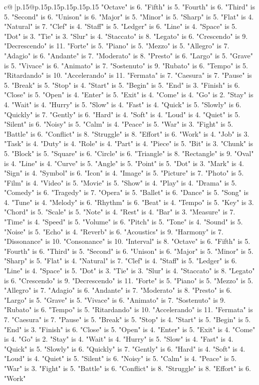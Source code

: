 \documentclass{article}
\begin{document}
{\begin{supertabular}{c@{$\;$}|p{.15\linewidth}@{}p{.15\linewidth}p{.15\linewidth}p{.15\linewidth}p{.15\linewidth}p{.15\linewidth}}
{{{"Octave" is 6. "Fifth" is 5. "Fourth" is 6. "Third" is 5. "Second" is 6. "Unison" is 6. "Major" is 5. "Minor" is 5. "Sharp" is 5. "Flat" is 4. "Natural" is 7. "Clef" is 4. "Staff" is 5. "Ledger" is 6. "Line" is 4. "Space" is 5. "Dot" is 3. "Tie" is 3. "Slur" is 4. "Staccato" is 8. "Legato" is 6. "Crescendo" is 9. "Decrescendo" is 11. "Forte" is 5. "Piano" is 5. "Mezzo" is 5. "Allegro" is 7. "Adagio" is 6. "Andante" is 7. "Moderato" is 8. "Presto" is 6. "Largo" is 5. "Grave" is 5. "Vivace" is 6. "Animato" is 7. "Sostenuto" is 9. "Rubato" is 6. "Tempo" is 5. "Ritardando" is 10. "Accelerando" is 11. "Fermata" is 7. "Caesura" is 7. "Pause" is 5. "Break" is 5. "Stop" is 4. "Start" is 5. "Begin" is 5. "End" is 3. "Finish" is 6. "Close" is 5. "Open" is 4. "Enter" is 5. "Exit" is 4. "Come" is 4. "Go" is 2. "Stay" is 4. "Wait" is 4. "Hurry" is 5. "Slow" is 4. "Fast" is 4. "Quick" is 5. "Slowly" is 6. "Quickly" is 7. "Gently" is 6. "Hard" is 4. "Soft" is 4. "Loud" is 4. "Quiet" is 5. "Silent" is 6. "Noisy" is 5. "Calm" is 4. "Peace" is 5. "War" is 3. "Fight" is 5. "Battle" is 6. "Conflict" is 8. "Struggle" is 8. "Effort" is 6. "Work" is 4. "Job" is 3. "Task" is 4. "Duty" is 4. "Role" is 4. "Part" is 4. "Piece" is 5. "Bit" is 3. "Chunk" is 5. "Block" is 5. "Square" is 6. "Circle" is 6. "Triangle" is 8. "Rectangle" is 9. "Oval" is 4. "Line" is 4. "Curve" is 5. "Angle" is 5. "Point" is 5. "Dot" is 3. "Mark" is 4. "Sign" is 4. "Symbol" is 6. "Icon" is 4. "Image" is 5. "Picture" is 7. "Photo" is 5. "Film" is 4. "Video" is 5. "Movie" is 5. "Show" is 4. "Play" is 4. "Drama" is 5. "Comedy" is 6. "Tragedy" is 7. "Opera" is 5. "Ballet" is 6. "Dance" is 5. "Song" is 4. "Tune" is 4. "Melody" is 6. "Rhythm" is 6. "Beat" is 4. "Tempo" is 5. "Key" is 3. "Chord" is 5. "Scale" is 5. "Note" is 4. "Rest" is 4. "Bar" is 3. "Measure" is 7. "Time" is 4. "Speed" is 5. "Volume" is 6. "Pitch" is 5. "Tone" is 4. "Sound" is 5. "Noise" is 5. "Echo" is 4. "Reverb" is 6. "Acoustics" is 9. "Harmony" is 7. "Dissonance" is 10. "Consonance" is 10. "Interval" is 8. "Octave" is 6. "Fifth" is 5. "Fourth" is 6. "Third" is 5. "Second" is 6. "Unison" is 6. "Major" is 5. "Minor" is 5. "Sharp" is 5. "Flat" is 4. "Natural" is 7. "Clef" is 4. "Staff" is 5. "Ledger" is 6. "Line" is 4. "Space" is 5. "Dot" is 3. "Tie" is 3. "Slur" is 4. "Staccato" is 8. "Legato" is 6. "Crescendo" is 9. "Decrescendo" is 11. "Forte" is 5. "Piano" is 5. "Mezzo" is 5. "Allegro" is 7. "Adagio" is 6. "Andante" is 7. "Moderato" is 8. "Presto" is 6. "Largo" is 5. "Grave" is 5. "Vivace" is 6. "Animato" is 7. "Sostenuto" is 9. "Rubato" is 6. "Tempo" is 5. "Ritardando" is 10. "Accelerando" is 11. "Fermata" is 7. "Caesura" is 7. "Pause" is 5. "Break" is 5. "Stop" is 4. "Start" is 5. "Begin" is 5. "End" is 3. "Finish" is 6. "Close" is 5. "Open" is 4. "Enter" is 5. "Exit" is 4. "Come" is 4. "Go" is 2. "Stay" is 4. "Wait" is 4. "Hurry" is 5. "Slow" is 4. "Fast" is 4. "Quick" is 5. "Slowly" is 6. "Quickly" is 7. "Gently" is 6. "Hard" is 4. "Soft" is 4. "Loud" is 4. "Quiet" is 5. "Silent" is 6. "Noisy" is 5. "Calm" is 4. "Peace" is 5. "War" is 3. "Fight" is 5. "Battle" is 6. "Conflict" is 8. "Struggle" is 8. "Effort" is 6. "Work" }}}
\end{supertabular}}
\end{document}
